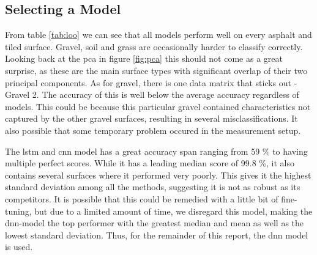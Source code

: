 \subsection{Selecting a Model}


From table \ref{tab:loo} we can see that all models perform well on every asphalt and tiled surface. Gravel, soil and grass are occasionally harder to classify correctly. Looking back at the \gls{pca} in figure \ref{fig:pca} this should not come as a great surprise, as these are the main surface types with significant overlap of their two principal components. As for gravel, there is one data matrix that sticks out - Gravel 2. The accuracy of this is well below the average accuracy regardless of models. This could be because this particular gravel contained characteristics not captured by the other gravel surfaces, resulting in several misclassifications. It also possible that some temporary problem occured in the measurement setup.

The \gls{lstm} and \gls{cnn} model has a great accuracy span ranging from 59 \% to having multiple perfect scores. While it has a leading median score of 99.8 \%, it also contains several surfaces where it performed very poorly. This gives it the highest standard deviation among all the methods, suggesting it is not as robust as its competitors. It is possible that this could be remedied with a little bit of fine-tuning, but due to a limited amount of time, we disregard this model, making the \gls{dnn}-model the top performer with the greatest median and mean as well as the lowest standard deviation. Thus, for the remainder of this report, the \gls{dnn} model is used.







